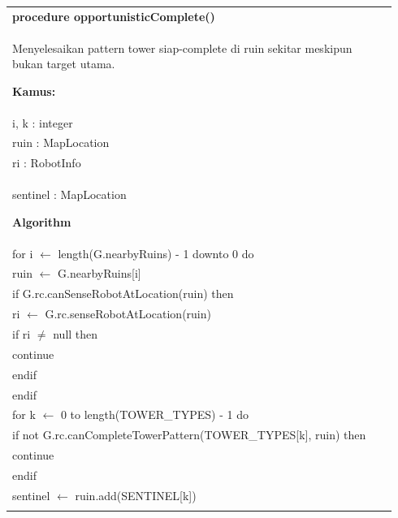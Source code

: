 \documentclass{article}
\newenvironment{pseudobox}
{
\centering
\begin{longtable}{|p{0.94\linewidth}|}
\hline
}
{
\\ \hline
\end{longtable}
\vspace{0.05cm}
}
\begin{document}
\begin{pseudobox}
\textbf{procedure opportunisticComplete()} \\
{ Menyelesaikan pattern tower siap-complete di ruin sekitar meskipun bukan target utama. }

\textbf{Kamus:} \\
\hspace*{1em} i, k : integer \\
\hspace*{1em} ruin : MapLocation \\
\hspace*{1em} ri : RobotInfo \\
\hspace*{1em} sentinel : MapLocation

\textbf{Algorithm} \\
\hspace*{1em} for i $\leftarrow$ length(G.nearbyRuins) - 1 downto 0 do \\
\hspace*{2em} ruin $\leftarrow$ G.nearbyRuins[i] \\
\hspace*{2em} if G.rc.canSenseRobotAtLocation(ruin) then \\
\hspace*{3em} ri $\leftarrow$ G.rc.senseRobotAtLocation(ruin) \\
\hspace*{3em} if ri $\neq$ null then \\
\hspace*{4em} continue \\
\hspace*{3em} endif \\
\hspace*{2em} endif \\

\hspace*{2em} for k $\leftarrow$ 0 to length(TOWER\_TYPES) - 1 do \\
\hspace*{3em} if not G.rc.canCompleteTowerPattern(TOWER\_TYPES[k], ruin) then \\
\hspace*{4em} continue \\
\hspace*{3em} endif \\

\hspace*{3em} sentinel $\leftarrow$ ruin.add(SENTINEL[k]) \\


\end{pseudobox}
\end{document}

